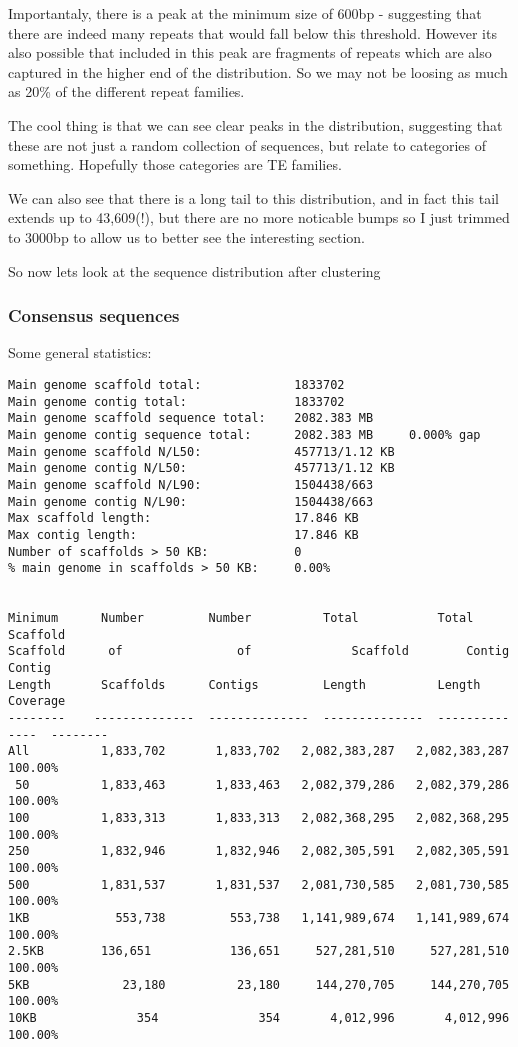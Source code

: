\documentclass[11pt]{article}
\begin{document}
Importantaly, there is a peak at the minimum size of 600bp - suggesting
that there are indeed many repeats that would fall below this threshold.
However its also possible that included in this peak are fragments of
repeats which are also captured in the higher end of the distribution.
So we may not be loosing as much as 20\% of the different repeat
families.

The cool thing is that we can see clear peaks in the distribution,
suggesting that these are not just a random collection of sequences, but
relate to categories of something. Hopefully those categories are TE
families.

We can also see that there is a long tail to this distribution, and in
fact this tail extends up to 43,609(!), but there are no more noticable
bumps so I just trimmed to 3000bp to allow us to better see the
interesting section.

So now lets look at the sequence distribution after clustering

    \subsubsection{Consensus sequences}\label{consensus-sequences}

    Some general statistics:

\begin{verbatim}
Main genome scaffold total:             1833702  
Main genome contig total:               1833702  
Main genome scaffold sequence total:    2082.383 MB  
Main genome contig sequence total:      2082.383 MB     0.000% gap  
Main genome scaffold N/L50:             457713/1.12 KB  
Main genome contig N/L50:               457713/1.12 KB  
Main genome scaffold N/L90:             1504438/663  
Main genome contig N/L90:               1504438/663  
Max scaffold length:                    17.846 KB  
Max contig length:                      17.846 KB  
Number of scaffolds > 50 KB:            0  
% main genome in scaffolds > 50 KB:     0.00%  


Minimum      Number         Number          Total           Total           Scaffold  
Scaffold      of                of              Scaffold        Contig          Contig    
Length       Scaffolds      Contigs         Length          Length          Coverage  
--------    --------------  --------------  --------------  --------------  --------  
All          1,833,702       1,833,702   2,082,383,287   2,082,383,287   100.00%  
 50          1,833,463       1,833,463   2,082,379,286   2,082,379,286   100.00%  
100          1,833,313       1,833,313   2,082,368,295   2,082,368,295   100.00%  
250          1,832,946       1,832,946   2,082,305,591   2,082,305,591   100.00%  
500          1,831,537       1,831,537   2,081,730,585   2,081,730,585   100.00%  
1KB            553,738         553,738   1,141,989,674   1,141,989,674   100.00%  
2.5KB        136,651           136,651     527,281,510     527,281,510   100.00%  
5KB             23,180          23,180     144,270,705     144,270,705   100.00%  
10KB              354              354       4,012,996       4,012,996   100.00%  
\end{verbatim}
\end{document}
